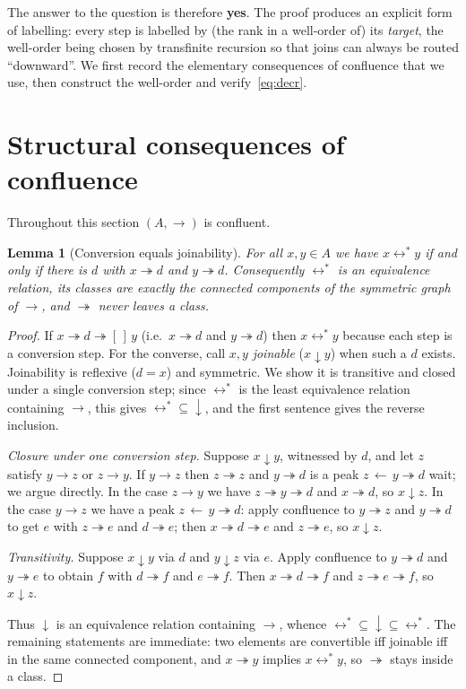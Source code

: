 \documentclass{amsart}
\newtheorem{lemma}{Lemma}
\theoremstyle{definition}
\theoremstyle{remark}
\newcommand{\redto}{\rightarrow}
\newcommand{\redtt}{\twoheadrightarrow}
\newcommand{\conv}{\leftrightarrow^{*}}
\begin{document}
The answer to the question is therefore \textbf{yes}.  The proof produces an
explicit form of labelling: every step is labelled by (the rank in a
well-order of) its \emph{target}, the well-order being chosen by transfinite
recursion so that joins can always be routed ``downward''.  We first record the
elementary consequences of confluence that we use, then construct the
well-order and verify~\eqref{eq:decr}.

\section{Structural consequences of confluence}

Throughout this section $(A,\redto)$ is confluent.

\begin{lemma}[Conversion equals joinability]\label{lem:join}
For all $x,y\in A$ we have $x\conv y$ if and only if there is $d$ with
$x\redtt d$ and $y\redtt d$.  Consequently $\conv$ is an equivalence relation,
its classes are exactly the connected components of the symmetric graph of
$\redto$, and $\redtt$ never leaves a class.
\end{lemma}

\begin{proof}
If $x\redtt d\redtt[\,]\, y$ (i.e.\ $x\redtt d$ and $y\redtt d$) then $x\conv
y$ because each step is a conversion step.  For the converse, call $x,y$
\emph{joinable} ($x\downarrow y$) when such a $d$ exists.  Joinability is
reflexive ($d=x$) and symmetric.  We show it is transitive and closed under a
single conversion step; since $\conv$ is the least equivalence relation
containing $\redto$, this gives $\conv{}\subseteq{}\downarrow$, and the first
sentence gives the reverse inclusion.

\emph{Closure under one conversion step.}  Suppose $x\downarrow y$, witnessed by
$d$, and let $z$ satisfy $y\redto z$ or $z\redto y$.  If $y\redto z$ then
$z\redtt z$ and $y\redtt d$ is a peak $z\,{\leftarrow}\,y\redtt d$ wait; we
argue directly.  In the case $z\redto y$ we have $z\redtt y\redtt d$ and
$x\redtt d$, so $x\downarrow z$.  In the case $y\redto z$ we have a peak
$z\,{}{\leftarrow}\,y\redtt d$: apply confluence to $y\redtt z$ and $y\redtt
d$ to get $e$ with $z\redtt e$ and $d\redtt e$; then $x\redtt d\redtt e$ and
$z\redtt e$, so $x\downarrow z$.

\emph{Transitivity.}  Suppose $x\downarrow y$ via $d$ and $y\downarrow z$ via
$e$.  Apply confluence to $y\redtt d$ and $y\redtt e$ to obtain $f$ with
$d\redtt f$ and $e\redtt f$.  Then $x\redtt d\redtt f$ and $z\redtt e\redtt f$,
so $x\downarrow z$.

Thus $\downarrow$ is an equivalence relation containing $\redto$, whence
$\conv\subseteq\downarrow\subseteq\conv$.  The remaining statements are
immediate: two elements are convertible iff joinable iff in the same connected
component, and $x\redtt y$ implies $x\conv y$, so $\redtt$ stays inside a
class.
\end{proof}
\end{document}
